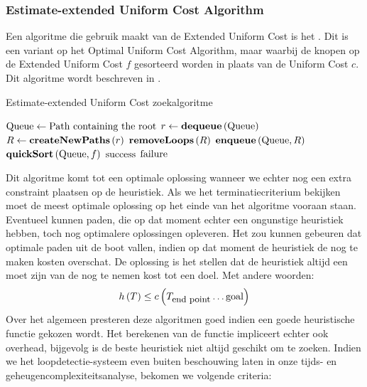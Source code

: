 \subsubsection{Estimate-extended Uniform Cost Algorithm}
Een algoritme die gebruik maakt van de Extended Uniform Cost is het . Dit is een variant op het Optimal Uniform Cost Algorithm, maar waarbij de knopen op de Extended Uniform Cost $f$ gesorteerd worden in plaats van de Uniform Cost $c$. Dit algoritme wordt beschreven in .
\begin{algorithm}[htb]                      %
\caption{Estimate-extended Uniform Cost zoekalgoritme}          %
\label{alg:estimateExtendedUniformCost}                           %
\begin{algorithmic}[1]                    %
\STATE $\mbox{Queue}\leftarrow\mbox{Path containing the root}$
\WHILE{$\notempty{\queue}\wedge\neg\goalreached{\queue\left[0\right]}$}
\STATE $r\leftarrow\mbox{\bf dequeue}\left( \mbox{Queue} \right)$
\STATE $R\leftarrow\mbox{\bf createNewPaths}\left( r \right)$
\STATE $\mbox{\bf removeLoops}\left( R \right)$
\STATE $\mbox{\bf enqueue}\left( \mbox{Queue},R \right)$
\STATE $\mbox{\bf quickSort}\left( \mbox{Queue},f \right)$
\ENDWHILE
\IF{$\goalreached{\queue\left[0\right]}$}
\RETURN $\mbox{success}$
\ELSE
\RETURN $\mbox{failure}$
\ENDIF
\end{algorithmic}
\end{algorithm}
Dit algoritme komt tot een optimale oplossing wanneer we echter nog een extra constraint plaatsen op de heuristiek. Als we het terminatiecriterium bekijken moet de meest optimale oplossing op het einde van het algoritme vooraan staan. Eventueel kunnen paden, die op dat moment echter een ongunstige heuristiek hebben, toch nog optimalere oplossingen opleveren. Het zou kunnen gebeuren dat optimale paden uit de boot vallen, indien op dat moment de heuristiek de nog te maken kosten overschat. De oplossing is het stellen dat de heuristiek altijd een  moet zijn van de nog te nemen kost tot een doel. Met andere woorden:
\begin{equation}
h\left(T\right)\leq c\left(T_{\mbox{\small{end point}}}\ldots\mbox{goal}\right)
\end{equation}
Over het algemeen presteren deze algoritmen goed indien een goede heuristische functie gekozen wordt. Het berekenen van de functie impliceert echter ook overhead, bijgevolg is de beste heuristiek niet altijd geschikt om te zoeken. Indien we het loopdetectie-systeem even buiten beschouwing laten in onze tijds- en geheugencomplexiteitsanalyse, bekomen we volgende criteria:
